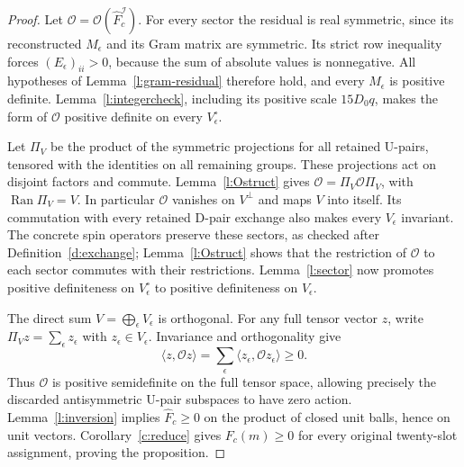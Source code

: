 \begin{proof}
Let \(\mathcal O=\mathcal O(\widehat F_c^{\mathcal I})\).
For every sector the residual is real symmetric, since its
reconstructed \(M_\epsilon\) and its Gram matrix are symmetric.
Its strict row inequality forces
\((E_\epsilon)_{ii}>0\), because the sum of absolute values is
nonnegative.  All hypotheses of Lemma~\ref{l:gram-residual}
therefore hold, and every \(M_\epsilon\) is positive definite.
Lemma~\ref{l:integercheck}, including its positive scale
\(15D_0q\), makes the form of \(\mathcal O\) positive definite
on every \(V_\epsilon^\circ\).

Let \(\Pi_V\) be the product of the symmetric projections for
all retained \(\mathrm U\)-pairs, tensored with the identities
on all remaining groups.  These projections act on disjoint
factors and commute.  Lemma~\ref{l:Ostruct} gives
\(\mathcal O=\Pi_V\mathcal O\Pi_V\), with
\(\operatorname{Ran}\Pi_V=V\).  In particular \(\mathcal O\)
vanishes on \(V^\perp\) and maps \(V\) into itself.
Its commutation with every retained \(\mathrm D\)-pair exchange
also makes every \(V_\epsilon\) invariant.  The concrete spin
operators preserve these sectors, as checked after
Definition~\ref{d:exchange}; Lemma~\ref{l:Ostruct} shows that
the restriction of \(\mathcal O\) to each sector commutes with
their restrictions.  Lemma~\ref{l:sector} now promotes positive
definiteness on \(V_\epsilon^\circ\) to positive definiteness
on \(V_\epsilon\).

The direct sum \(V=\bigoplus_\epsilon V_\epsilon\) is orthogonal.
For any full tensor vector \(z\), write
\(\Pi_Vz=\sum_\epsilon z_\epsilon\) with
\(z_\epsilon\in V_\epsilon\).  Invariance and orthogonality give
\[
 \langle z,\mathcal Oz\rangle
       =\sum_\epsilon\langle z_\epsilon,
                                  \mathcal Oz_\epsilon\rangle\ge0.
\]
Thus \(\mathcal O\) is positive semidefinite on the full tensor
space, allowing precisely the discarded antisymmetric
\(\mathrm U\)-pair subspaces to have zero action.
Lemma~\ref{l:inversion} implies \(\widehat F_c\ge0\) on the
product of closed unit balls, hence on unit vectors.
Corollary~\ref{c:reduce} gives \(F_c(m)\ge0\) for every original
twenty-slot assignment, proving the proposition.
\end{proof}

